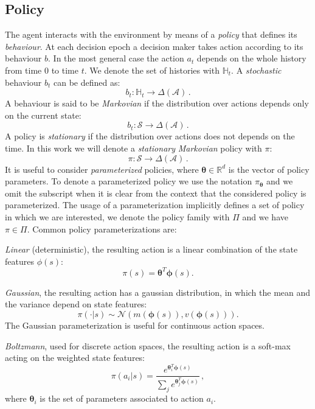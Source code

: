  \subsection{Policy} \label{sec:policy}
The agent interacts with the environment by means of a \textit{policy} that defines its \textit{behaviour}. At each decision epoch a decision maker takes action according to its behaviour $b$. In the most general case the action $a_t$ depends on the whole history from time 0 to time $t$. We denote the set of histories with $\mathbb{H}_t$. A \textit{stochastic} behaviour $b_t$ can be defined as:
\begin{equation}
	b_t : \mathbb{H}_t \rightarrow \Delta(\mathcal{A}) \, .
\end{equation}
A behaviour is said to be \textit{Markovian} if the distribution over actions depends only on the current state:
\begin{equation}
	b_t : \mathcal{S} \rightarrow \Delta(\mathcal{A}) \, .
\end{equation}
A policy is \textit{stationary} if the distribution over actions does not depends on the time.
In this work we will denote a \textit{stationary} \textit{Markovian} policy with $\pi$: 
\begin{equation}
	\pi : \mathcal{S} \rightarrow \Delta (\mathcal{A}) \, .
\end{equation}
It is useful to consider \textit{parameterized} policies, where $\boldsymbol{\theta} \in \mathbb{R}^d$ is the vector of policy parameters. To denote a parameterized policy we use the notation $\pi_{\boldsymbol{\theta}}$ and we omit the subscript when it is clear from the context that the  considered policy is parameterized. The usage of a parameterization implicitly defines a set of policy in which we are interested, we denote the policy family with $\Pi$ and we have $\pi \in \Pi$. 
Common policy parameterizations are:
\begin{description}
\item \textit{Linear} (deterministic), the resulting action is a linear combination of the state features $\phi(s)$:
\begin{equation}
\pi(s) = \boldsymbol{\theta}^T \boldsymbol{\phi}(s) .
\end{equation}
\item \textit{Gaussian}, the resulting action has a gaussian distribution, in which the mean and the variance depend on state features:
\begin{equation}
\pi( \cdot | s) \sim \mathcal{N} ( m( \boldsymbol{\phi}(s)), v(\boldsymbol{\phi}(s)) ) .
\end{equation}
The Gaussian parameterization is useful for continuous action spaces.
\item \textit{Boltzmann}, used for discrete action spaces, the resulting action is a soft-max acting on the weighted state features:
\begin{equation}
\pi(a_i | s) = \frac{e^{\boldsymbol{\theta}_i^T \boldsymbol{\phi}(s)}}{\sum_j e^{\boldsymbol{\theta}_j^T \boldsymbol{\phi}(s)}} \, ,
\end{equation}
where $\boldsymbol{\theta}_i$ is the set of parameters associated to action $a_i$.
\end{description}
